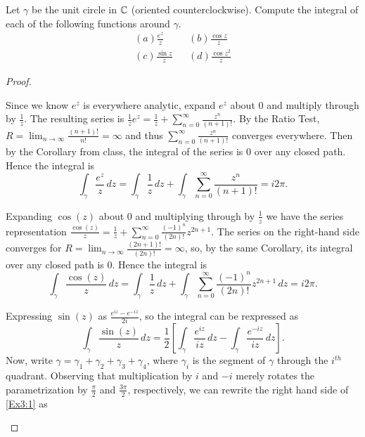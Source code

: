\documentclass[10pt]{amsart}
\begin{document}
\begin{thm}
  \label{Ex3}
  Let $\gamma$ be the unit circle in $\mathbb{C}$ (oriented counterclockwise).  
  Compute the integral of each of 
  the following functions around $\gamma$.
  \medskip
  \begin{align*}
    (a) \frac{e^z}{z}     & & (b) \frac{\cos z}{z}\\
    (c) \frac{\sin z}{z}  & & (d) \frac{\cos z^2}{z}
  \end{align*}
  \begin{proof}
    \begin{alphaenum}
    \item
      Since we know $e^z$ is everywhere analytic, expand $e^z$ about 0 and multiply through by $\frac{1}{z}$.
      The resulting series is $\frac{1}{z}e^z = \frac{1}{z} + \sum_{n=0}^{\infty} \frac{z^n}{(n+1)!}$.
      By the Ratio Test, $R = \lim_{n\rightarrow\infty} \frac{(n+1)!}{n!} = \infty$ and thus $\sum_{n=0}^{\infty} \frac{z^n}{(n+1)!}$ converges everywhere.
      Then by the Corollary from class, the integral of the series is 0 over any closed path.
      Hence the integral is $$\int_\gamma\frac{e^z}{z}\,dz = \int_{\gamma}\frac{1}{z}\,dz + \int_{\gamma}\sum_{n=0}^{\infty} \frac{z^n}{(n+1)!} = i2\pi.$$
    \item
      Expanding $\cos(z)$ about 0 and multiplying through by $\frac{1}{z}$ we have the series representation $\frac{\cos(z)}{z} = \frac{1}{z} + \sum_{n=0}^{\infty} \frac{(-1)^n}{(2n)!} z^{2n+1}$.
      The series on the right-hand side converges for $R = \lim_{n\rightarrow\infty} \frac{(2n+1)!}{(2n)!} = \infty$, so, by the same Corollary, its integral over any closed path is 0.
      Hence the integral is $$\int_{\gamma}\frac{\cos(z)}{z}\,dz = \int_{\gamma}\frac{1}{z}\,dz + \int_{\gamma}\sum_{n=0}^{\infty} \frac{(-1)^n}{(2n)!} z^{2n+1}\,dz = i2\pi.$$
    \item
      Expressing $\sin(z)$ as $\frac{e^{iz} - e^{-iz}}{2i}$, so the integral can be rexpressed as
      \begin{equation}
        \label{Ex3:1}
        \int_{\gamma}\frac{\sin(z)}{z}\,dz = \frac{1}{2}\left[ \int_\gamma \frac{e^{iz}}{iz}\,dz - \int_{\gamma}\frac{e^{-iz}}{iz}\,dz\right].
      \end{equation}
      Now, write $\gamma = \gamma_1 + \gamma_2 + \gamma_3 + \gamma_4$, where $\gamma_i$ is the segment of $\gamma$ through the $i^{th}$ quadrant.
      Observing that multiplication by $i$ and $-i$ merely rotates the parametrization by $\frac{\pi}{2}$ and $\frac{3\pi}{2}$, respectively, we can rewrite the right hand side of \eqref{Ex3:1} as

\end{alphaenum}
\end{proof}
\end{thm}
\end{document}
